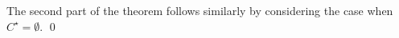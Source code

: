 The second part of the theorem follows similarly by considering the case when $C^\star = \emptyset.$ \hfill\qed



